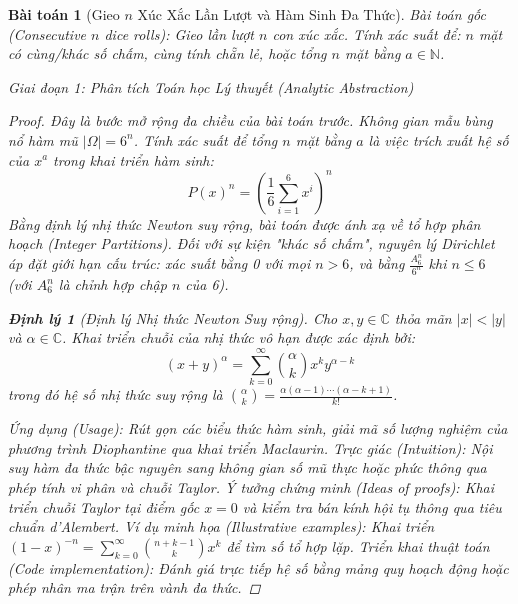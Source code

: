 \documentclass{article}
\newtheorem{baitoan}{Bài toán}
\newtheorem{dinhly}{Định lý}
\begin{document}
\begin{baitoan}[Gieo $n$ Xúc Xắc Lần Lượt và Hàm Sinh Đa Thức]
 \emph{Bài toán gốc (Consecutive $n$ dice rolls):} 
 Gieo lần lượt $n$ con xúc xắc. Tính xác suất để: $n$ mặt có cùng/khác số chấm, cùng tính chẵn lẻ, hoặc tổng $n$ mặt bằng $a\in\mathbb{N}$.

\vspace{0.5em}\noindent\emph{Giai đoạn 1: Phân tích Toán học Lý thuyết (Analytic Abstraction)}
 
 \begin{proof}
 Đây là bước mở rộng đa chiều của bài toán trước. Không gian mẫu bùng nổ hàm mũ $|\Omega| = 6^n$. 
 Tính xác suất để tổng $n$ mặt bằng $a$ là việc trích xuất hệ số của $x^a$ trong khai triển hàm sinh:
 \begin{equation}
 P(x)^n = \left(\frac{1}{6} \sum_{i=1}^6 x^i\right)^n
 \end{equation}
 Bằng định lý nhị thức Newton suy rộng, bài toán được ánh xạ về tổ hợp phân hoạch (Integer Partitions). Đối với sự kiện "khác số chấm", nguyên lý Dirichlet áp đặt giới hạn cấu trúc: xác suất bằng 0 với mọi $n > 6$, và bằng $\frac{A_6^n}{6^n}$ khi $n \le 6$ (với $A_6^n$ là chỉnh hợp chập $n$ của 6).

\begin{dinhly}[Định lý Nhị thức Newton Suy rộng]
Cho $x, y \in \mathbb{C}$ thỏa mãn $|x| < |y|$ và $\alpha \in \mathbb{C}$. Khai triển chuỗi của nhị thức vô hạn được xác định bởi:
$$ (x+y)^\alpha = \sum_{k=0}^{\infty} \binom{\alpha}{k} x^k y^{\alpha-k} $$
trong đó hệ số nhị thức suy rộng là $\binom{\alpha}{k} = \frac{\alpha(\alpha-1)\cdots(\alpha-k+1)}{k!}$.
\end{dinhly}
\emph{Ứng dụng (Usage):} Rút gọn các biểu thức hàm sinh, giải mã số lượng nghiệm của phương trình Diophantine qua khai triển Maclaurin.
\emph{Trực giác (Intuition):} Nội suy hàm đa thức bậc nguyên sang không gian số mũ thực hoặc phức thông qua phép tính vi phân và chuỗi Taylor.
\emph{Ý tưởng chứng minh (Ideas of proofs):} Khai triển chuỗi Taylor tại điểm gốc $x=0$ và kiểm tra bán kính hội tụ thông qua tiêu chuẩn d'Alembert.
\emph{Ví dụ minh họa (Illustrative examples):} Khai triển $(1-x)^{-n} = \sum_{k=0}^{\infty} \binom{n+k-1}{k} x^k$ để tìm số tổ hợp lặp.
\emph{Triển khai thuật toán (Code implementation):} Đánh giá trực tiếp hệ số bằng mảng quy hoạch động hoặc phép nhân ma trận trên vành đa thức.


\end{proof}
\end{baitoan}
\end{document}
